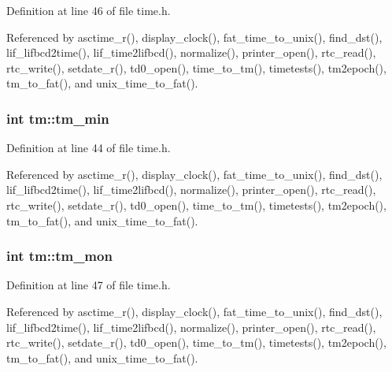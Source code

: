 Definition at line 46 of file time.\+h.



Referenced by asctime\+\_\+r(), display\+\_\+clock(), fat\+\_\+time\+\_\+to\+\_\+unix(), find\+\_\+dst(), lif\+\_\+lifbcd2time(), lif\+\_\+time2lifbcd(), normalize(), printer\+\_\+open(), rtc\+\_\+read(), rtc\+\_\+write(), setdate\+\_\+r(), td0\+\_\+open(), time\+\_\+to\+\_\+tm(), timetests(), tm2epoch(), tm\+\_\+to\+\_\+fat(), and unix\+\_\+time\+\_\+to\+\_\+fat().

\subsubsection[{\texorpdfstring{tm\+\_\+min}{tm_min}}]{\setlength{\rightskip}{0pt plus 5cm}int tm\+::tm\+\_\+min}\hypertarget{structtm_af414eb7c86cc3099595211eee4d4211b}{}\label{structtm_af414eb7c86cc3099595211eee4d4211b}


Definition at line 44 of file time.\+h.



Referenced by asctime\+\_\+r(), display\+\_\+clock(), fat\+\_\+time\+\_\+to\+\_\+unix(), find\+\_\+dst(), lif\+\_\+lifbcd2time(), lif\+\_\+time2lifbcd(), normalize(), printer\+\_\+open(), rtc\+\_\+read(), rtc\+\_\+write(), setdate\+\_\+r(), td0\+\_\+open(), time\+\_\+to\+\_\+tm(), timetests(), tm2epoch(), tm\+\_\+to\+\_\+fat(), and unix\+\_\+time\+\_\+to\+\_\+fat().

\subsubsection[{\texorpdfstring{tm\+\_\+mon}{tm_mon}}]{\setlength{\rightskip}{0pt plus 5cm}int tm\+::tm\+\_\+mon}\hypertarget{structtm_a112ac36fa2f593777138a417cf031e17}{}\label{structtm_a112ac36fa2f593777138a417cf031e17}


Definition at line 47 of file time.\+h.



Referenced by asctime\+\_\+r(), display\+\_\+clock(), fat\+\_\+time\+\_\+to\+\_\+unix(), find\+\_\+dst(), lif\+\_\+lifbcd2time(), lif\+\_\+time2lifbcd(), normalize(), printer\+\_\+open(), rtc\+\_\+read(), rtc\+\_\+write(), setdate\+\_\+r(), td0\+\_\+open(), time\+\_\+to\+\_\+tm(), timetests(), tm2epoch(), tm\+\_\+to\+\_\+fat(), and unix\+\_\+time\+\_\+to\+\_\+fat().

